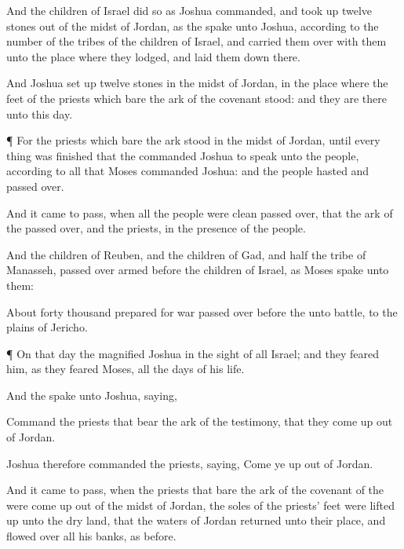 {And the
children of
Israel
did so as
Joshua
commanded, and took
up
twelve
stones out of the
midst of
Jordan, as the
{}
spake unto
Joshua, according to the
number of the
tribes of the
children of
Israel, and carried them
over with them unto the place where they
lodged, and laid them
down there.

And
Joshua set
up
twelve
stones in the
midst of
Jordan, in the place where the
feet of the
priests which
bare the
ark of the
covenant
stood: and they are there unto this
day.


\par }{\PP {}¶ For the
priests which
bare the
ark
stood in the
midst of
Jordan, until every
thing was
finished that the
{}
commanded
Joshua to
speak unto the
people, according to all that
Moses
commanded
Joshua: and the
people
hasted and passed
over.

And it came to pass, when all the
people were
clean passed
over, that the
ark of the
{} passed
over, and the
priests, in the
presence of the
people.

And the
children of
Reuben, and the
children of
Gad, and
half the
tribe of
Manasseh, passed
over
armed
before the
children of
Israel, as
Moses
spake unto them:

About
forty
thousand
prepared for
war passed
over
before the
{} unto
battle, to the
plains of
Jericho.


\par }{\PP {}¶ On that
day the
{}
magnified
Joshua in the
sight of all
Israel; and they
feared him, as they
feared
Moses, all the
days of his
life.

And the
{}
spake unto
Joshua,
saying,

Command the
priests that
bear the
ark of the
testimony, that they come
up out of
Jordan.

Joshua therefore
commanded the
priests,
saying, Come ye
up out of
Jordan.

And it came to pass, when the
priests that
bare the
ark of the
covenant of the
{} were come
up out of the
midst of
Jordan,
{} the
soles of the
priests’
feet were lifted
up unto the dry
land, that the
waters of
Jordan
returned unto their
place, and
flowed over all his
banks,
as
{}
before.


}
